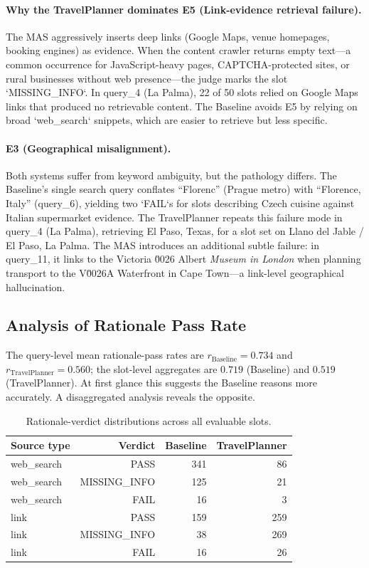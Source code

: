\documentclass[a4paper,oneside,bibliography=totoc]{scrbook}
\begin{document}
\paragraph{Why the TravelPlanner dominates E5 (Link-evidence retrieval failure).} The MAS aggressively inserts deep links (Google Maps, venue homepages, booking engines) as evidence. When the content crawler returns empty text---a common occurrence for JavaScript-heavy pages, CAPTCHA-protected sites, or rural businesses without web presence---the judge marks the slot `MISSING\_INFO`. In query\_4 (La Palma), 22 of 50 slots relied on Google Maps links that produced no retrievable content. The Baseline avoids E5 by relying on broad `web_search` snippets, which are easier to retrieve but less specific.

\paragraph{E3 (Geographical misalignment).} Both systems suffer from keyword ambiguity, but the pathology differs. The Baseline's single search query conflates ``Florenc'' (Prague metro) with ``Florence, Italy'' (query\_6), yielding two `FAIL`s for slots describing Czech cuisine against Italian supermarket evidence. The TravelPlanner repeats this failure mode in query\_4 (La Palma), retrieving El Paso, Texas, for a slot set on Llano del Jable / El Paso, La Palma. The MAS introduces an additional subtle failure: in query\_11, it links to the Victoria \u0026 Albert \emph{Museum in London} when planning transport to the V\u0026A Waterfront in Cape Town---a link-level geographical hallucination.

\subsection{Analysis of Rationale Pass Rate}
\label{subsec:rationale}

The query-level mean rationale-pass rates are $r_{\text{Baseline}} = 0.734$ and $r_{\text{TravelPlanner}} = 0.560$; the slot-level aggregates are $0.719$ (Baseline) and $0.519$ (TravelPlanner). At first glance this suggests the Baseline reasons more accurately. A disaggregated analysis reveals the opposite.

\begin{table}[htbp]
\centering
\caption{Rationale-verdict distributions across all evaluable slots.}
\label{tab:rationale-dist}
\begin{tabular}{@{}lrrr@{}}
\toprule
\textbf{Source type} & \textbf{Verdict} & \textbf{Baseline} & \textbf{TravelPlanner} \\
\midrule
web\_search & PASS & 341 & 86 \\
web\_search & MISSING\_INFO & 125 & 21 \\
web\_search & FAIL & 16 & 3 \\
link & PASS & 159 & 259 \\
link & MISSING\_INFO & 38 & 269 \\
link & FAIL & 16 & 26 \\
\bottomrule
\end{tabular}
\end{table}
\end{document}
